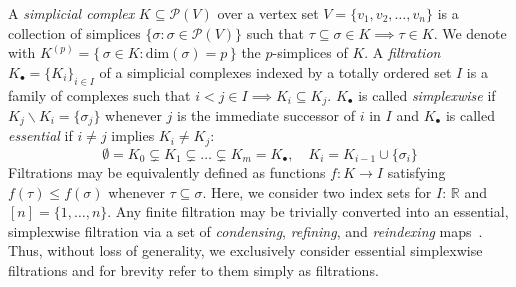 A \emph{simplicial complex} $K \subseteq \mathcal{P}(V)$ over a vertex set $V = \{v_1, v_2, \dots, v_n \}$ is a collection of simplices $\{\sigma : \sigma \in \mathcal{P}(V) \}$ such that $\tau \subseteq \sigma \in K \implies \tau \in K$.
We denote with $K^{(p)} = \{ \, \sigma \in K : \mathrm{dim}(\sigma) = p \, \}$ the $p$-simplices of $K$. 
A \emph{filtration} $K_\bullet = \{K_i\}_{i\in I}$ of a simplicial complexes indexed by a totally ordered set $I$ is a family of complexes such that $i< j \in I \implies K_i \subseteq K_j$. $K_\bullet$ is called \emph{simplexwise} if $K_j \smallsetminus K_i = \{\sigma_j\}$ whenever $j$ is the immediate successor of $i$ in $I$ and $K_\bullet$ is called \emph{essential} if $i \neq j$ implies $K_i \neq K_j$:
\begin{equation}
	\emptyset = K_0 \subsetneq K_1 \subsetneq \dots \subsetneq K_m  = K_\bullet, \quad K_i  = K_{i-1} \cup \{\sigma_i\}
\end{equation} 
Filtrations may be equivalently defined as functions $f : K \to I$ satisfying $f(\tau) \leq f(\sigma)$ whenever $\tau \subseteq \sigma$. Here, we consider two index sets for $I$: $\mathbb{R}$ and $[n] = \{ 1, \dots, n\}$. 
Any finite filtration may be trivially converted into an essential, simplexwise filtration via a set of \emph{condensing}, \emph{refining}, and \emph{reindexing} maps~\cite{bauer2021ripser}. Thus, without loss of generality, we exclusively consider essential simplexwise filtrations and for brevity refer to them simply as filtrations.
